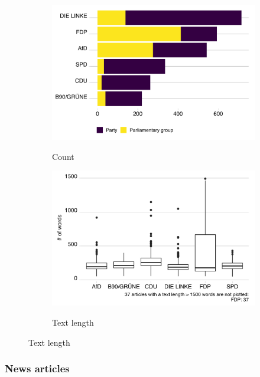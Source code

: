 \documentclass[12pt,a4paper,notitlepage]{article}
\begin{document}
\begin{figure}[H]
	\begin{center}
	\caption{Press releases}
		\begin{subfigure}[normla]{0.49\textwidth}
			\caption{Count}
			\includegraphics[width=\textwidth]{../figs/press_releases}
			\label{fig_press}
		\end{subfigure}
		\begin{subfigure}[normla]{0.49\textwidth}
			\caption{Text length}
			\includegraphics[width=\textwidth]{../figs/press_releases_textlength}
			\label{fig_press_textlength}
		\end{subfigure}
	\end{center}
\end{figure}


\subsubsection{News articles}
\end{document}
